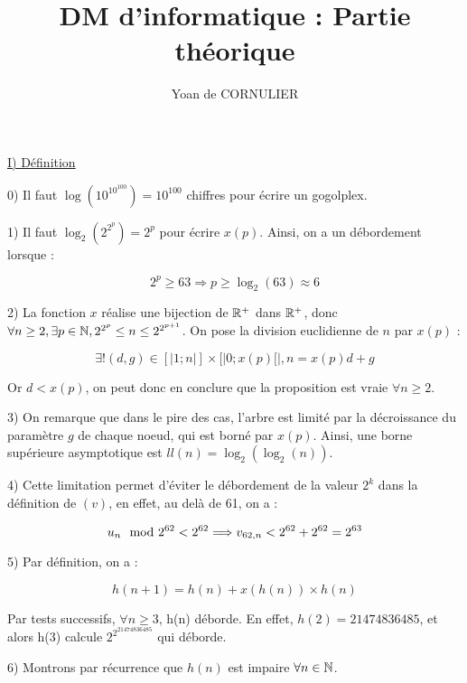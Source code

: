 \documentclass{article}
\title{DM d'informatique : Partie théorique}
\author{Yoan de CORNULIER}
\date{}
\begin{document}
\maketitle

\bigskip
\bigskip

\underline{I) Définition}

\bigskip
\bigskip

0) Il faut $\log(10^{10^100})=10^{100}$ chiffres pour écrire un gogolplex.

\bigskip
\bigskip

1) Il faut $\log_2(2^{2^p})=2^p$ pour écrire $x(p)$. Ainsi, on a un débordement lorsque :

$$2^p\geq63\Longrightarrow p\geq\log_2(63)\approx6$$

\bigskip
\bigskip

2) La fonction $x$ réalise une bijection de $\mathbb{R}^+$ dans $\mathbb{R}^+$, donc $\forall n\geq2,\exists p\in\mathbb{N}, 2^{2^p}\leq n\leq 2^{2^{p+1}}$. On pose la division euclidienne de $n$ par $x(p)$ :

$$
\exists! (d, g)\in[|1; n|]\times[|0; x(p)[|, n = x(p)d + g
$$

Or $d< x(p)$, on peut donc en conclure que la proposition est vraie $\forall n\geq2$.

\bigskip
\bigskip

3) On remarque que dans le pire des cas, l'arbre est limité par la décroissance du paramètre $g$ de chaque noeud, qui est borné par $x(p)$. Ainsi, une borne supérieure asymptotique est $ll(n)=\log_2(\log_2(n))$.

\bigskip
\bigskip

4) Cette limitation permet d'éviter le débordement de la valeur $2^k$ dans la définition de $(v)$, en effet, au delà de 61, on a :

$$
u_n \mod 2^{62} < 2^{62}\\
\Longrightarrow v_{62,n}< 2^{62} + 2^{62} = 2^{63}
$$

\bigskip
\bigskip

5) Par définition, on a :

$$
h(n+1)=h(n)+x(h(n))\times h(n)
$$

Par tests successifs, $\forall n\geq3$, h(n) déborde. En effet, $h(2)=21474836485$, et alors h(3) calcule $2^{2^{21474836485}}$ qui déborde.

\bigskip
\bigskip

6) Montrons par récurrence que $h(n)$ est impaire $\forall n\in\mathbb{N}$.
\end{document}
